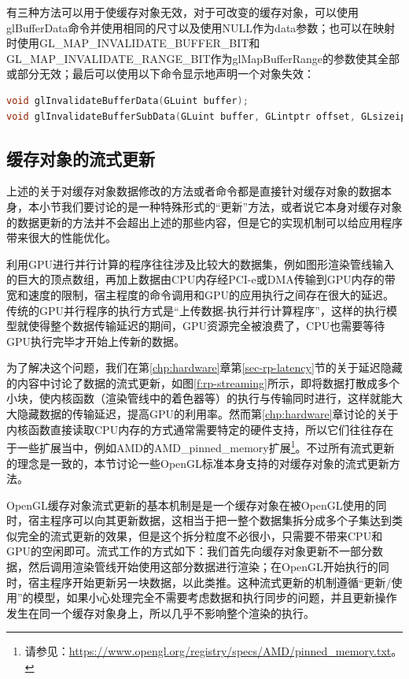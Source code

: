 有三种方法可以用于使缓存对象无效，对于可改变的缓存对象，可以使用glBufferData​命令并使用相同的尺寸以及使用NULL作为data参数；也可以在映射时使用GL\_MAP\_INVALIDATE\_BUFFER\_BIT和GL\_MAP\_INVALIDATE\_RANGE\_BIT作为glMapBufferRange​的参数使其全部或部分无效；最后可以使用以下命令显示地声明一个对象失效：

\begin{lstlisting}[language=C++]
void glInvalidateBufferData​(GLuint buffer​);
void glInvalidateBufferSubData​(GLuint buffer​, GLintptr offset​, GLsizeiptr length​);
\end{lstlisting}





\subsection{缓存对象的流式更新}
上述的关于对缓存对象数据修改的方法或者命令都是直接针对缓存对象的数据本身，本小节我们要讨论的是一种特殊形式的“更新”方法，或者说它本身对缓存对象的数据更新的方法并不会超出上述的那些内容，但是它的实现机制可以给应用程序带来很大的性能优化。

利用GPU进行并行计算的程序往往涉及比较大的数据集，例如图形渲染管线输入的巨大的顶点数组，再加上数据由CPU内存经PCI-e或DMA传输到GPU内存的带宽和速度的限制，宿主程度的命令调用和GPU的应用执行之间存在很大的延迟。传统的GPU并行程序的执行方式是“上传数据-执行并行计算程序”，这样的执行模型就使得整个数据传输延迟的期间，GPU资源完全被浪费了，CPU也需要等待GPU执行完毕才开始上传新的数据。

为了解决这个问题，我们在第\ref{chp:hardware}章第\ref{sec-rp-latency}节的关于延迟隐藏的内容中讨论了数据的流式更新，如图\ref{f:rp-streaming}所示，即将数据打散成多个小块，使内核函数（渲染管线中的着色器等）的执行与传输同时进行，这样就能大大隐藏数据的传输延迟，提高GPU的利用率。然而第\ref{chp:hardware}章讨论的关于内核函数直接读取CPU内存的方式通常需要特定的硬件支持，所以它们往往存在于一些扩展当中，例如AMD的AMD\_pinned\_memory扩展\footnote{请参见：\url{https://www.opengl.org/registry/specs/AMD/pinned_memory.txt}。}。不过所有流式更新的理念是一致的，本节讨论一些OpenGL标准本身支持的对缓存对象的流式更新方法。

OpenGL缓存对象流式更新的基本机制是是一个缓存对象在被OpenGL使用的同时，宿主程序可以向其更新数据，这相当于把一整个数据集拆分成多个子集达到类似完全的流式更新的效果，但是这个拆分粒度不必很小，只需要不带来CPU和GPU的空闲即可。流式工作的方式如下：我们首先向缓存对象更新不一部分数据，然后调用渲染管线开始使用这部分数据进行渲染；在OpenGL开始执行的同时，宿主程序开始更新另一块数据，以此类推。这种流式更新的机制遵循“更新/使用”的模型，如果小心处理完全不需要考虑数据和执行同步的问题，并且更新操作发生在同一个缓存对象身上，所以几乎不影响整个渲染的执行。


